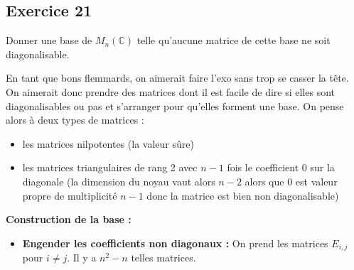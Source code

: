 \documentclass[a4paper,12pt]{article}
\begin{document}
    \subsection*{Exercice 21}
    Donner une base de \( M_n(\mathbb{C}) \) telle qu'aucune matrice de cette base ne soit diagonalisable.
    
    \begin{correctionbox}
        En tant que bons flemmards, on aimerait faire l'exo sans trop se casser la tête. On aimerait donc prendre des matrices dont il est facile de dire si elles sont diagonalisables ou pas et s'arranger pour qu'elles forment une base. On pense alors à deux types de matrices :
        \begin{itemize}
        \item les matrices nilpotentes (la valeur sûre)
        \item les matrices triangulaires de rang 2 avec \( n-1 \) fois le coefficient 0 sur la diagonale (la dimension du noyau vaut alors \( n-2 \) alors que 0 est valeur propre de multiplicité \( n-1 \) donc la matrice est bien non diagonalisable)
        \end{itemize}
        
        \vspace{0.5em}
        
        \textbf{Construction de la base :}
        
        \vspace{0.5em}
        
        \begin{itemize}
        \item \textbf{Engender les coefficients non diagonaux :} On prend les matrices \( E_{i,j} \) pour \( i \neq j \). Il y a \( n^2 - n \) telles matrices.
        

\end{itemize}
\end{correctionbox}
\end{document}
